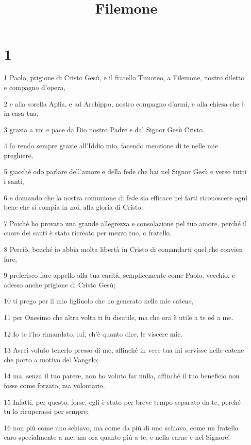 

\title{Filemone}


\chapter{1}

\par 1 Paolo, prigione di Cristo Gesù, e il fratello Timoteo, a Filemone, nostro diletto e compagno d'opera,
\par 2 e alla sorella Apfia, e ad Archippo, nostro compagno d'armi, e alla chiesa che è in casa tua,
\par 3 grazia a voi e pace da Dio nostro Padre e dal Signor Gesù Cristo.
\par 4 Io rendo sempre grazie all'Iddio mio, facendo menzione di te nelle mie preghiere,
\par 5 giacché odo parlare dell'amore e della fede che hai nel Signor Gesù e verso tutti i santi,
\par 6 e domando che la nostra comunione di fede sia efficace nel farti riconoscere ogni bene che si compia in noi, alla gloria di Cristo.
\par 7 Poiché ho provato una grande allegrezza e consolazione pel tuo amore, perché il cuore dei santi è stato ricreato per mezzo tuo, o fratello.
\par 8 Perciò, benché io abbia molta libertà in Cristo di comandarti quel che convien fare,
\par 9 preferisco fare appello alla tua carità, semplicemente come Paolo, vecchio, e adesso anche prigione di Cristo Gesù;
\par 10 ti prego per il mio figliuolo che ho generato nelle mie catene,
\par 11 per Onesimo che altra volta ti fu disutile, ma che ora è utile a te ed a me.
\par 12 Io te l'ho rimandato, lui, ch'è quanto dire, le viscere mie.
\par 13 Avrei voluto tenerlo presso di me, affinché in vece tua mi servisse nelle catene che porto a motivo del Vangelo;
\par 14 ma, senza il tuo parere, non ho voluto far nulla, affinché il tuo beneficio non fosse come forzato, ma volontario.
\par 15 Infatti, per questo, forse, egli è stato per breve tempo separato da te, perché tu lo ricuperassi per sempre;
\par 16 non più come uno schiavo, ma come da più di uno schiavo, come un fratello caro specialmente a me, ma ora quanto più a te, e nella carne e nel Signore!
